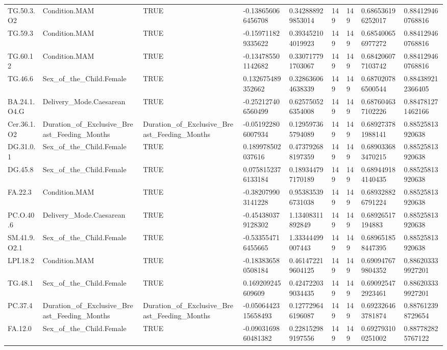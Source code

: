 \begin{longtable}{lllllllll}
TG.50.3.O2 & Condition.MAM & TRUE & -0.138656066456708 & 0.342888929853014 & 149 & 149 & 0.686536196252017 & 0.884129460768816 \\
TG.59.3 & Condition.MAM & TRUE & -0.159711829335622 & 0.393452104019923 & 149 & 149 & 0.685400656977272 & 0.884129460768816 \\
TG.60.12 & Condition.MAM & TRUE & -0.134785501142682 & 0.330717791703067 & 149 & 149 & 0.684206077103742 & 0.884129460768816 \\
TG.46.6 & Sex\_of\_the\_Child.Female & TRUE & 0.132675489352662 & 0.328636064638339 & 149 & 149 & 0.687020786500544 & 0.884389212366405 \\
BA.24.1.O4.G & Delivery\_Mode.Caesarean & TRUE & -0.252127406560499 & 0.625750526354008 & 149 & 149 & 0.687604637102226 & 0.884781271462166 \\
Cer.36.1.O2 & Duration\_of\_Exclusive\_Breast\_Feeding\_Months & Duration\_of\_Exclusive\_Breast\_Feeding\_Months & -0.051922806007934 & 0.129597365794089 & 149 & 149 & 0.689273781988141 & 0.88525813920638 \\
DG.31.0.1 & Sex\_of\_the\_Child.Female & TRUE & 0.189978502037616 & 0.473792688197359 & 149 & 149 & 0.689033683470215 & 0.88525813920638 \\
DG.45.8 & Sex\_of\_the\_Child.Female & TRUE & 0.0758152376133184 & 0.189344797170189 & 149 & 149 & 0.689449184140435 & 0.88525813920638 \\
FA.22.3 & Condition.MAM & TRUE & -0.382079903141228 & 0.953835396731038 & 149 & 149 & 0.689328826791224 & 0.88525813920638 \\
PC.O.40.6 & Delivery\_Mode.Caesarean & TRUE & -0.454380379128302 & 1.13408311892849 & 149 & 149 & 0.68926517194883 & 0.88525813920638 \\
SM.41.9.O2.1 & Sex\_of\_the\_Child.Female & TRUE & -0.533554716455665 & 1.33344499007443 & 149 & 149 & 0.689651858447395 & 0.88525813920638 \\
LPI.18.2 & Condition.MAM & TRUE & -0.183836580508184 & 0.461472219604125 & 149 & 149 & 0.690947679804352 & 0.886203339927201 \\
TG.48.1 & Sex\_of\_the\_Child.Female & TRUE & 0.169209245609609 & 0.424722039034435 & 149 & 149 & 0.690925472923461 & 0.886203339927201 \\
PC.37.4 & Duration\_of\_Exclusive\_Breast\_Feeding\_Months & Duration\_of\_Exclusive\_Breast\_Feeding\_Months & -0.0506442315658493 & 0.127729646196087 & 149 & 149 & 0.692326463781874 & 0.887612398729654 \\
FA.12.0 & Sex\_of\_the\_Child.Female & TRUE & -0.0903169860481382 & 0.228152989197556 & 149 & 149 & 0.692793100251002 & 0.887782825767122 \\

\end{longtable}
